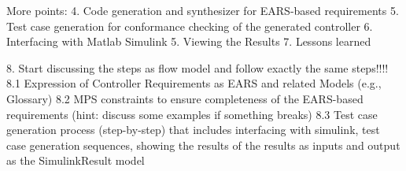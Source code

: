 More points:
4. Code generation and synthesizer for EARS-based requirements
5. Test case generation for conformance checking of the generated controller
6. Interfacing with Matlab Simulink
5. Viewing the Results
7. Lessons learned

8. Start discussing the steps as flow model and follow exactly the same
steps!!!! 
8.1 Expression of Controller Requirements as EARS and related Models (e.g.,
Glossary) 
8.2 MPS constraints to ensure completeness of the EARS-based requirements
(hint: discuss some examples if something breaks) 
8.3 Test case generation process (step-by-step) that includes interfacing with
simulink, test case generation sequences, showing the results of the results as
inputs and output as the SimulinkResult model
